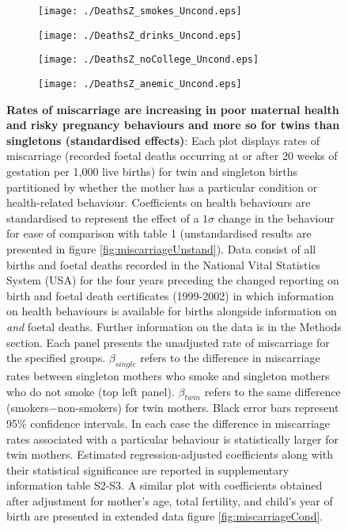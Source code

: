 \documentclass{nature}
\begin{document}
\begin{linenumbers}
\begin{spacing}{1}
\begin{figure}[htpb!]
\begin{subfigure}{.5\textwidth}
  \texttt{[image: ./DeathsZ\_smokes\_Uncond.eps]}
\end{subfigure}%
\begin{subfigure}{.5\textwidth}
  \texttt{[image: ./DeathsZ\_drinks\_Uncond.eps]}
\end{subfigure}
\begin{subfigure}{.5\textwidth}
  \texttt{[image: ./DeathsZ\_noCollege\_Uncond.eps]}
\end{subfigure}%
\begin{subfigure}{.5\textwidth}
  \texttt{[image: ./DeathsZ\_anemic\_Uncond.eps]}
\end{subfigure}
\vspace{5mm}
\caption{\textbf{Rates of miscarriage are increasing in poor maternal health and risky pregnancy behaviours and more so for twins than singletons (standardised effects)}: {\footnotesize Each plot displays rates of miscarriage (recorded foetal deaths occurring at or after 20 weeks of gestation per 1,000 live births) for twin and singleton births partitioned by whether the mother has a particular condition or health-related behaviour. Coefficients on health behaviours are standardised to represent the effect of a $1\sigma$ change in the behaviour for ease of comparison with table 1 (unstandardised results are presented in figure \ref{fig:miscarriageUnstand}). Data consist of all births and foetal deaths recorded in the National Vital Statistics System (USA) for the four years preceding the changed reporting on birth and foetal death certificates (1999-2002) in which information on health behaviours is available for births alongside information on \emph{and} foetal deaths. Further information on the data is in the Methods section. Each panel presents the unadjusted rate of miscarriage for the specified groups. $\beta_{single}$ refers to the difference in miscarriage rates between singleton mothers who smoke and singleton mothers who do not smoke (top left panel). $\beta_{twin}$ refers to the same difference (smokers$-$non-smokers) for twin mothers.  Black error bars represent 95\% confidence intervals. In each case the difference in miscarriage rates associated with a particular behaviour is statistically larger for twin mothers.  Estimated regression-adjusted coefficients along with their statistical significance are reported in supplementary information table S2-S3. A similar plot with coefficients obtained after adjustment for mother's age, total fertility, and child's year of birth are presented in extended data figure \ref{fig:miscarriageCond}.}}
\label{fig:mech}
\end{figure}
\end{spacing}



\end{linenumbers}
\end{document}
